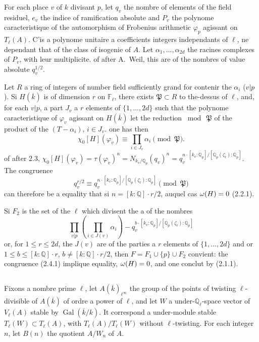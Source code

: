 \documentclass[12pt,a4paper]{article}
\theoremstyle{plain}
\theoremstyle{definition}
\theoremstyle{remark}
\DeclareMathOperator{\Gal}{Gal}
\newcommand{\QQ}{\mathbb{Q}}
\newcommand{\FF}{\mathbb{F}}
\let\deg\relax
\providecommand{\FF}{\mathbb{F}}
\providecommand{\QQ}{\mathbb{Q}}
\providecommand{\fP}{\mathfrak{P}}
\providecommand{\Gal}{\operatorname{Gal}}
\begin{document}
For each place $v$ of $k$ divisant $p$, let $q_v$ the nombre of elements of the field residuel, $e_v$ the indice of ramification absolute and $P_v$ the polynome caracteristique of the automorphism of Frobenius arithmetic $\varphi_p$ agissant on $T_\ell(A)$. C'is a polynome unitaire a coefficients integers independants of $\ell$, ne dependant that of the class of isogenie of $A$. Let $\alpha_1, \ldots, \alpha_{2d}$ the racines complexes of $P_v$, with leur multiplicite. of after A.~Weil, this are of the nombres of value absolute $q_v^{1/2}$.

Let $R$ a ring of integers of number field sufficiently grand for contenir the $\alpha_i$ ($v|p$). Si $H(\overline{k})$ is of dimension $r$ on $\FF_\ell$, there exists $\fP \subset R$ to the-dessus of $\ell$, and, for each $v|p$, a part $J_v$ a $r$ elements of $\{1, \ldots, 2d\}$ such that the polynome caracteristique of $\varphi_v$ agissant on $H(\overline{k})$ let the reduction $\bmod\ \fP$ of the product of the $(T - \alpha_i)$, $i \in J_v$. one has then
\[
\chi_0[H](\varphi_v) \equiv \prod_{i \in J_v} \alpha_i \pmod{\fP}.
\]
of after 2.3, $\chi_0[H](\varphi_v) = \tau(\varphi_v)^n = N_{k_v/\QQ_p}(q_v)^n = q_v^{n \cdot [k_v:\QQ_p]/[\QQ_p(\zeta_\ell):\QQ_p]}$. The congruence
\[
q_v^{r/2} \equiv q_v^{n \cdot [k_v:\QQ_p]/[\QQ_p(\zeta_\ell):\QQ_p]} \pmod{\fP}
\]
can therefore be a equality that si $n = [k:\QQ] \cdot r/2$, auquel cas $\deg \omega(H) = 0$ (2.2.1).

Si $F_2$ is the set of the $\ell$ which divisent the a of the nombres
\[
\prod_{v|p} \left(\prod_{i \in J(v)} \alpha_i \right) - q_v^{b \cdot [k_v:\QQ_p]/[\QQ_p(\zeta_\ell):\QQ_p]}
\]
or, for $1 \leq r \leq 2d$, the $J(v)$ are of the parties a $r$ elements of $\{1, \ldots, 2d\}$ and or $1 \leq b \leq [k:\QQ] \cdot r$, $b \neq [k:\QQ] \cdot r/2$, then $F = F_1 \cup \{p\} \cup F_2$ convient: the congruence (2.4.1) implique equality, $\deg \omega(H) = 0$, and one conclut by (2.1.1).

\subsection{}

Fixons a nombre prime $\ell$, let $A(\overline{k})_{\ell^\infty}$ the group of the points of twisting $\ell$-divisible of $A(\overline{k})$ of ordre a power of $\ell$, and let $W$ a under-$\QQ_\ell$-space vector of $V_\ell(A)$ stable by $\Gal(\overline{k}/k)$. It correspond a under-module stable $T_\ell(W) \subset T_\ell(A)$, with $T_\ell(A)/T_\ell(W)$ without $\ell$-twisting. For each integer $n$, let $B(n)$ the quotient $A/W_n$ of $A$.
\end{document}
